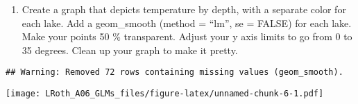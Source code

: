 \documentclass[]{article}
\newenvironment{Shaded}{\begin{snugshade}}{\end{snugshade}}
\newcommand{\KeywordTok}[1]{\textcolor[rgb]{0.13,0.29,0.53}{\textbf{#1}}}
\newcommand{\DataTypeTok}[1]{\textcolor[rgb]{0.13,0.29,0.53}{#1}}
\newcommand{\DecValTok}[1]{\textcolor[rgb]{0.00,0.00,0.81}{#1}}
\newcommand{\FloatTok}[1]{\textcolor[rgb]{0.00,0.00,0.81}{#1}}
\newcommand{\StringTok}[1]{\textcolor[rgb]{0.31,0.60,0.02}{#1}}
\newcommand{\CommentTok}[1]{\textcolor[rgb]{0.56,0.35,0.01}{\textit{#1}}}
\newcommand{\OtherTok}[1]{\textcolor[rgb]{0.56,0.35,0.01}{#1}}
\newcommand{\OperatorTok}[1]{\textcolor[rgb]{0.81,0.36,0.00}{\textbf{#1}}}
\newcommand{\NormalTok}[1]{#1}
\providecommand{\tightlist}{%
  \setlength{\itemsep}{0pt}\setlength{\parskip}{0pt}}
\begin{document}
\begin{enumerate}
\def\labelenumi{\arabic{enumi}.}
\setcounter{enumi}{15}
\tightlist
\item
  Create a graph that depicts temperature by depth, with a separate
  color for each lake. Add a geom\_smooth (method = ``lm'', se = FALSE)
  for each lake. Make your points 50 \% transparent. Adjust your y axis
  limits to go from 0 to 35 degrees. Clean up your graph to make it
  pretty.
\end{enumerate}

\begin{Shaded}
\end{Shaded}

\begin{verbatim}
## Warning: Removed 72 rows containing missing values (geom_smooth).
\end{verbatim}

\texttt{[image: LRoth\_A06\_GLMs\_files/figure-latex/unnamed-chunk-6-1.pdf]}
\end{document}

